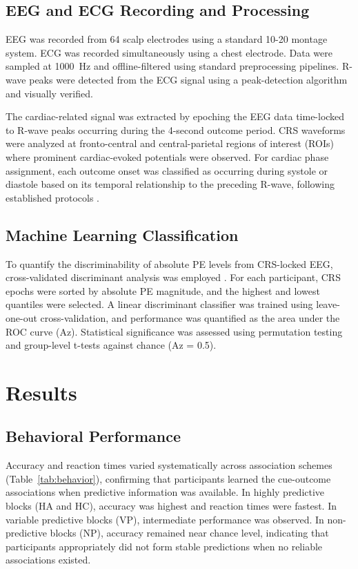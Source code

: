 \documentclass[12pt]{article}
\begin{document}
\subsection{EEG and ECG Recording and Processing}

EEG was recorded from 64 scalp electrodes using a standard 10-20 montage system. ECG was recorded simultaneously using a chest electrode. Data were sampled at 1000~Hz and offline-filtered using standard preprocessing pipelines. R-wave peaks were detected from the ECG signal using a peak-detection algorithm and visually verified.

The cardiac-related signal was extracted by epoching the EEG data time-locked to R-wave peaks occurring during the 4-second outcome period. CRS waveforms were analyzed at fronto-central and central-parietal regions of interest (ROIs) where prominent cardiac-evoked potentials were observed. For cardiac phase assignment, each outcome onset was classified as occurring during systole or diastole based on its temporal relationship to the preceding R-wave, following established protocols \citep{garfinkel2014fear, azevedo2017cardiac}.

\subsection{Machine Learning Classification}

To quantify the discriminability of absolute PE levels from CRS-locked EEG, cross-validated discriminant analysis was employed \citep{parra2005recipes, sajda2009single}. For each participant, CRS epochs were sorted by absolute PE magnitude, and the highest and lowest quantiles were selected. A linear discriminant classifier was trained using leave-one-out cross-validation, and performance was quantified as the area under the ROC curve (Az). Statistical significance was assessed using permutation testing and group-level t-tests against chance (Az = 0.5).

\section{Results}

\subsection{Behavioral Performance}

Accuracy and reaction times varied systematically across association schemes (Table~\ref{tab:behavior}), confirming that participants learned the cue-outcome associations when predictive information was available. In highly predictive blocks (HA and HC), accuracy was highest and reaction times were fastest. In variable predictive blocks (VP), intermediate performance was observed. In non-predictive blocks (NP), accuracy remained near chance level, indicating that participants appropriately did not form stable predictions when no reliable associations existed.
\end{document}
